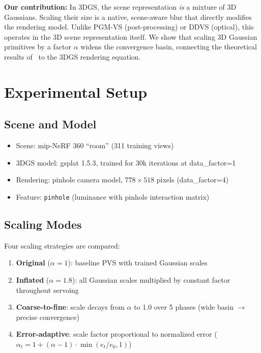 \documentclass[11pt]{article}
\begin{document}
\textbf{Our contribution:} In 3DGS, the scene representation \emph{is} a mixture of 3D Gaussians. Scaling their size is a native, scene-aware blur that directly modifies the rendering model. Unlike PGM-VS (post-processing) or DDVS (optical), this operates in the 3D scene representation itself. We show that scaling 3D Gaussian primitives by a factor $\alpha$ widens the convergence basin, connecting the theoretical results of~\cite{naamani2024iros} to the 3DGS rendering equation.


\section{Experimental Setup}

\subsection{Scene and Model}
\begin{itemize}
    \item Scene: mip-NeRF 360 ``room'' (311 training views)
    \item 3DGS model: gsplat 1.5.3, trained for 30k iterations at data\_factor=1
    \item Rendering: pinhole camera model, $778 \times 518$ pixels (data\_factor=4)
    \item Feature: \texttt{pinhole} (luminance with pinhole interaction matrix)
\end{itemize}

\subsection{Scaling Modes}
Four scaling strategies are compared:
\begin{enumerate}
    \item \textbf{Original} ($\alpha=1$): baseline PVS with trained Gaussian scales
    \item \textbf{Inflated} ($\alpha=1.8$): all Gaussian scales multiplied by constant factor throughout servoing
    \item \textbf{Coarse-to-fine}: scale decays from $\alpha$ to 1.0 over 5 phases (wide basin $\to$ precise convergence)
    \item \textbf{Error-adaptive}: scale factor proportional to normalized error ($\alpha_t = 1 + (\alpha-1) \cdot \min(e_t/e_0, 1)$)
\end{enumerate}
\end{document}
